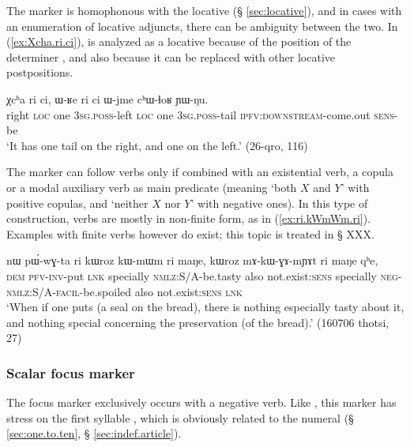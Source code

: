  The marker  is homophonous with the locative  (§ \ref{sec:locative}), and in cases with an enumeration of locative adjuncts, there can be ambiguity between the two. In (\ref{ex:Xcha.ri.ci}),  is analyzed as a locative because of the position of the determiner , and also because it can be replaced with other locative postpositions.
 
 \begin{exe}
\ex \label{ex:Xcha.ri.ci}
\gll   χcʰa ri ci, ɯ-ʁe ri ci ɯ-jme cʰɯ-ɬoʁ ɲɯ-ŋu. \\
right \textsc{loc} one  \textsc{3sg}.\textsc{poss}-left \textsc{loc} one \textsc{3sg}.\textsc{poss}-tail \textsc{ipfv}:\textsc{downstream}-come.out \textsc{sens}-be \\
\glt `It has one tail on the right, and one on the left.' (26-qro, 116)
\end{exe}

The marker  can follow verbs only if combined with an existential verb, a copula or a modal auxiliary verb as main predicate (meaning `both $X$ and $Y$' with positive copulas, and `neither $X$ nor $Y$' with negative ones). In this type of construction, verbs are mostly in non-finite form, as in (\ref{ex:ri.kWmWm.ri}). Examples with finite verbs however do exist; this topic is treated in § XXX. %

 \begin{exe}
\ex \label{ex:ri.kWmWm.ri}
 \gll   nɯ pɯ́-wɣ-ta ri  kɯroz kɯ-mɯm ri maŋe, kɯroz mɤ-kɯ-ɣɤ-mɲɤt ri maŋe qʰe, \\
 \textsc{dem} \textsc{pfv}-\textsc{inv}-put \textsc{lnk} specially \textsc{nmlz}:S/A-be.tasty also not.exist:\textsc{sens} specially \textsc{neg}-\textsc{nmlz}:S/A-\textsc{facil}-be.spoiled also not.exist:\textsc{sens} \textsc{lnk} \\
 \glt `When if one puts (a seal on the bread), there is nothing especially tasty about it, and nothing special concerning the preservation (of the bread).' (160706 thotsi, 27)
  \end{exe}
  

  
 \subsubsection{Scalar focus marker } \label{sec:cinA} 
 The focus marker  exclusively occurs with a negative verb. Like , this marker has stress on the first syllable , which is obviously related to the numeral  (§ \ref{sec:one.to.ten}, § \ref{sec:indef.article}).
 
